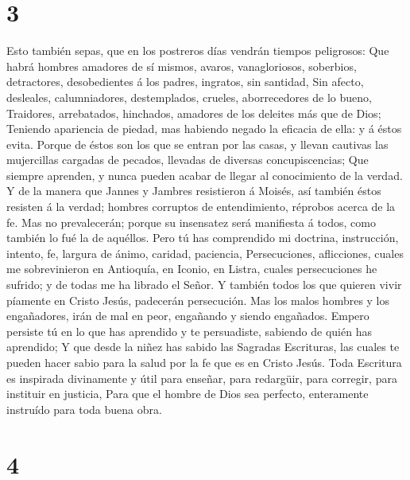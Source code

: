 \hypertarget{section-2}{%
\section{3}\label{section-2}}

 Esto también sepas, que en los postreros días vendrán
tiempos peligrosos:  Que habrá hombres amadores de sí
mismos, avaros, vanagloriosos, soberbios, detractores, desobedientes á
los padres, ingratos, sin santidad,  Sin afecto, desleales,
calumniadores, destemplados, crueles, aborrecedores de lo bueno,
 Traidores, arrebatados, hinchados, amadores de los deleites
más que de Dios;  Teniendo apariencia de piedad, mas
habiendo negado la eficacia de ella: y á éstos evita. 
Porque de éstos son los que se entran por las casas, y llevan cautivas
las mujercillas cargadas de pecados, llevadas de diversas
concupiscencias;  Que siempre aprenden, y nunca pueden
acabar de llegar al conocimiento de la verdad.  Y de la
manera que Jannes y Jambres resistieron á Moisés, así también éstos
resisten á la verdad; hombres corruptos de entendimiento, réprobos
acerca de la fe.  Mas no prevalecerán; porque su insensatez
será manifiesta á todos, como también lo fué la de aquéllos.
 Pero tú has comprendido mi doctrina, instrucción, intento,
fe, largura de ánimo, caridad, paciencia,  Persecuciones,
aflicciones, cuales me sobrevinieron en Antioquía, en Iconio, en Listra,
cuales persecuciones he sufrido; y de todas me ha librado el Señor.
 Y también todos los que quieren vivir píamente en Cristo
Jesús, padecerán persecución.  Mas los malos hombres y los
engañadores, irán de mal en peor, engañando y siendo engañados.
 Empero persiste tú en lo que has aprendido y te
persuadiste, sabiendo de quién has aprendido;  Y que desde
la niñez has sabido las Sagradas Escrituras, las cuales te pueden hacer
sabio para la salud por la fe que es en Cristo Jesús.  Toda
Escritura es inspirada divinamente y útil para enseñar, para redargüir,
para corregir, para instituir en justicia,  Para que el
hombre de Dios sea perfecto, enteramente instruído para toda buena obra.

\hypertarget{section-3}{%
\section{4}\label{section-3}}

